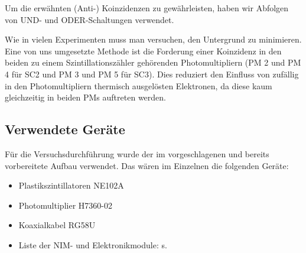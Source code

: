 Um die erwähnten (Anti-) Koinzidenzen zu gewährleisten, haben wir Abfolgen von
UND- und ODER-Schaltungen verwendet.

Wie in vielen Experimenten muss man versuchen, den Untergrund zu minimieren.
Eine von uns umgesetzte Methode ist die Forderung einer Koinzidenz in den
beiden zu einem Szintillationszähler gehörenden Photomultipliern (PM 2 und PM 4
für SC2 und PM 3 und PM 5 für SC3). Dies reduziert den Einfluss von zufällig in
den Photomultipliern thermisch ausgelösten Elektronen, da diese kaum
gleichzeitig in beiden PMs auftreten werden.

\subsection{Verwendete Geräte}

Für die Versuchsdurchführung wurde der im \cite{script} vorgeschlagenen und
bereits vorbereitete Aufbau verwendet. Das wären im Einzelnen die folgenden
Geräte:
\begin{itemize}
\item Plastikszintillatoren NE102A
\item Photomultiplier H7360-02
\item Koaxialkabel RG58U
\item Liste der NIM- und Elektronikmodule: s. \cite[Anhang B]{script}
\end{itemize}
